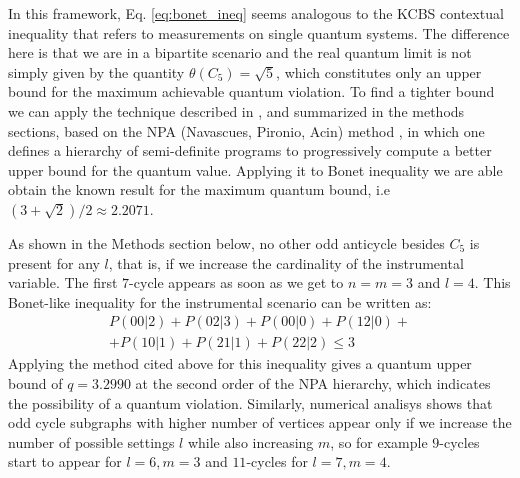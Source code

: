 \documentclass[letterpaper]{article}
\begin{document}
In this framework, Eq. \eqref{eq:bonet_ineq} seems analogous to the KCBS
contextual inequality \cite{kcbs2008} that refers to measurements on single
quantum systems. The difference here is that we are in a bipartite scenario and
the real quantum limit is not simply given by the quantity $\theta(C_5) =
\sqrt{5}$, which constitutes only an upper bound for the maximum achievable
quantum violation. To find a tighter bound we can apply the technique described in
\cite{rabelo2014}, and summarized in the methods sections, based on the NPA
(Navascues, Pironio, Acin) method \cite{npa2008}, in which one defines a hierarchy of
semi-definite programs to progressively compute a better upper bound for the
quantum value.
Applying it to Bonet inequality we are able obtain the known result for the
maximum quantum bound, i.e $(3+\sqrt{2})/2 \approx 2.2071$.

As shown in the Methods section below, no other odd anticycle besides
$C_5$ is present for any $l$, that is, if we increase the cardinality of the
instrumental variable. The first $7$-cycle appears as soon as we get to $n=m=3$ and $l=4$. This Bonet-like inequality for the instrumental scenario can be written as:
\begin{multline}
    P(00|2) + P(02|3) + P(00|0) + P(12|0) + \\
    + P(10|1) + P(21|1) + P(22|2) \le 3 
    \label{eq:c7_instrumental433}
\end{multline}
Applying the method cited above for this inequality gives a quantum upper bound
of $q = 3.2990$ at the second order of the NPA hierarchy, which indicates the
possibility of a quantum violation.
Similarly, numerical analisys shows that odd cycle subgraphs with higher number
of vertices appear only if we increase the number of possible settings $l$ while
also increasing $m$, so for example $9$-cycles start to appear for $l=6, m=3$ 
and $11$-cycles for $l=7, m=4$.
\end{document}
